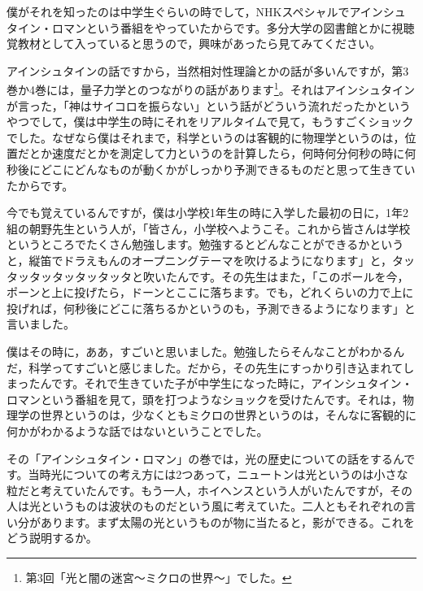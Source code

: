 \documentclass{ltjsbook}
\begin{document}
僕がそれを知ったのは中学生ぐらいの時でして，NHKスペシャルでアインシュタイン・ロマンという番組をやっていたからです。多分大学の図書館とかに視聴覚教材として入っていると思うので，興味があったら見てみてください。

アインシュタインの話ですから，当然相対性理論とかの話が多いんですが，第3巻か4巻には，量子力学とのつながりの話があります\footnote{第3回「光と闇の迷宮～ミクロの世界～」でした。}。それはアインシュタインが言った，「神はサイコロを振らない」という話がどういう流れだったかというやつでして，僕は中学生の時にそれをリアルタイムで見て，もうすごくショックでした。なぜなら僕はそれまで，科学というのは客観的に物理学というのは，位置だとか速度だとかを測定して力というのを計算したら，何時何分何秒の時に何秒後にどこにどんなものが動くかがしっかり予測できるものだと思って生きていたからです。

今でも覚えているんですが，僕は小学校1年生の時に入学した最初の日に，1年2組の朝野先生という人が，「皆さん，小学校へようこそ。これから皆さんは学校というところでたくさん勉強します。勉強するとどんなことができるかというと，縦笛でドラえもんのオープニングテーマを吹けるようになります」と，タッタッタッタッタッタッタと吹いたんです。その先生はまた，「このボールを今，ポーンと上に投げたら，ドーンとここに落ちます。でも，どれくらいの力で上に投げれば，何秒後にどこに落ちるかというのも，予測できるようになります」と言いました。

僕はその時に，ああ，すごいと思いました。勉強したらそんなことがわかるんだ，科学ってすごいと感じました。だから，その先生にすっかり引き込まれてしまったんです。それで生きていた子が中学生になった時に，アインシュタイン・ロマンという番組を見て，頭を打つようなショックを受けたんです。それは，物理学の世界というのは，少なくともミクロの世界というのは，そんなに客観的に何かがわかるような話ではないということでした。

その「アインシュタイン・ロマン」の巻では，光の歴史についての話をするんです。当時光についての考え方には2つあって，ニュートンは光というのは小さな粒だと考えていたんです。もう一人，ホイヘンスという人がいたんですが，その人は光というものは波状のものだという風に考えていた。二人ともそれぞれの言い分があります。まず太陽の光というものが物に当たると，影ができる。これをどう説明するか。
\end{document}
